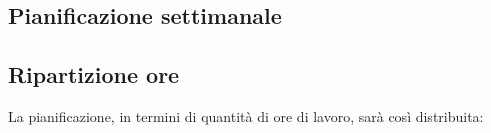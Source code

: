 
\subsection{Pianificazione settimanale}
	\prospettoSettimanale
	
	\newpage
	
\subsection{Ripartizione ore}
	La pianificazione, in termini di quantità di ore di lavoro, sarà così distribuita:
	
	\begin{center}
	    
	\end{center}

